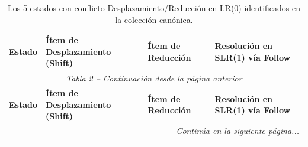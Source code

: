 \documentclass[12pt, letterpaper]{article}
\begin{document}
{\small
\begin{longtable}{c p{3.6cm} p{3.6cm} p{5.8cm}}
\caption{Los 5 estados con conflicto Desplazamiento/Reducción en LR(0) identificados en la colección canónica.} \\
\toprule
\textbf{Estado} & \textbf{Ítem de Desplazamiento (Shift)} & \textbf{Ítem de Reducción} & \textbf{Resolución en SLR(1) vía Follow} \\
\midrule
\endfirsthead
\multicolumn{4}{c}{\footnotesize\emph{Tabla 2 -- Continuación desde la página anterior}} \\
\toprule
\textbf{Estado} & \textbf{Ítem de Desplazamiento (Shift)} & \textbf{Ítem de Reducción} & \textbf{Resolución en SLR(1) vía Follow} \\
\midrule
\endhead
\midrule
\multicolumn{4}{r}{\footnotesize\emph{Continúa en la siguiente página...}} \\
\endfoot
\bottomrule
\endlastfoot


\end{longtable}}
\end{document}
